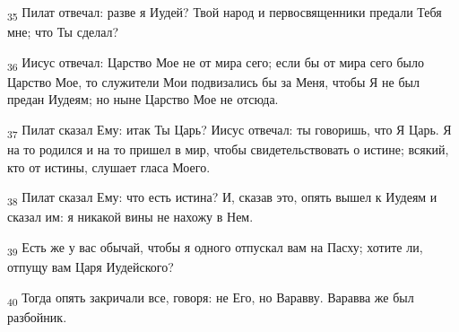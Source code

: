 \begin{tcolorbox}
\textsubscript{35} Пилат отвечал: разве я Иудей? Твой народ и первосвященники предали Тебя мне; что Ты сделал?
\end{tcolorbox}
\begin{tcolorbox}
\textsubscript{36} Иисус отвечал: Царство Мое не от мира сего; если бы от мира сего было Царство Мое, то служители Мои подвизались бы за Меня, чтобы Я не был предан Иудеям; но ныне Царство Мое не отсюда.
\end{tcolorbox}
\begin{tcolorbox}
\textsubscript{37} Пилат сказал Ему: итак Ты Царь? Иисус отвечал: ты говоришь, что Я Царь. Я на то родился и на то пришел в мир, чтобы свидетельствовать о истине; всякий, кто от истины, слушает гласа Моего.
\end{tcolorbox}
\begin{tcolorbox}
\textsubscript{38} Пилат сказал Ему: что есть истина? И, сказав это, опять вышел к Иудеям и сказал им: я никакой вины не нахожу в Нем.
\end{tcolorbox}
\begin{tcolorbox}
\textsubscript{39} Есть же у вас обычай, чтобы я одного отпускал вам на Пасху; хотите ли, отпущу вам Царя Иудейского?
\end{tcolorbox}
\begin{tcolorbox}
\textsubscript{40} Тогда опять закричали все, говоря: не Его, но Варавву. Варавва же был разбойник.
\end{tcolorbox}
